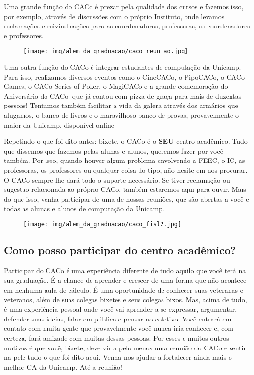 Uma grande função do CACo é prezar pela qualidade dos cursos e fazemos isso,
por exemplo, através de discussões com o próprio Instituto, onde levamos
reclamações e reivindicações para as coordenadoras, professoras, os
coordenadores e professores.

\begin{figure}[H]
  \centering
  \texttt{[image: img/alem\_da\_graduacao/caco\_reuniao.jpg]}
\end{figure}

Uma outra função do CACo é integrar estudantes de computação da Unicamp. Para
isso, realizamos diversos eventos como o CineCACo, o PipoCACo, o CACo Games, o
CACo Series of Poker, o MagiCACo e a grande comemoração do Aniversário do CACo,
que já contou com pizza de graça para mais de duzentas pessoas! Tentamos também
facilitar a vida da galera através dos armários que alugamos, o banco de livros
e o maravilhoso banco de provas, provavelmente o maior da Unicamp, disponível
online.

Repetindo o que foi dito antes: bixete, o CACo é o \textbf{SEU} centro
acadêmico. Tudo que dissemos que fazemos pelas alunas e alunos, queremos fazer
por você também. Por isso, quando houver algum problema envolvendo a FEEC, o
IC, as professoras, os professores ou qualquer coisa do tipo, não hesite em nos
procurar. O CACo sempre lhe dará todo o suporte necessário. Se tiver reclamação
ou sugestão relacionada ao próprio CACo, também estaremos aqui para ouvir. Mais
do que isso, venha participar de uma de nossas reuniões, que são abertas a você
e todas as alunas e alunos de computação da Unicamp.

\begin{figure}[H]
  \centering
  \texttt{[image: img/alem\_da\_graduacao/caco\_fisl2.jpg]}
\end{figure}

\subsection{Como posso participar do centro acadêmico?}

Participar do CACo é uma experiência diferente de tudo aquilo que você terá na
sua graduação. É a chance de aprender e crescer de uma forma que não acontece
em nenhuma aula de cálculo. É uma oportunidade de conhecer suas veteranas e
veteranos, além de suas colegas bixetes e seus colegas bixos. Mas, acima de
tudo, é uma experiência pessoal onde você vai aprender a se expressar,
argumentar, defender suas ideias, falar em público e pensar no coletivo. Você
entrará em contato com muita gente que provavelmente você nunca iria conhecer
e, com certeza, fará amizade com muitas dessas pessoas. Por esses e muitos
outros motivos é que você, bixete, deve vir a pelo menos uma reunião do CACo e
sentir na pele tudo o que foi dito aqui. Venha nos ajudar a fortalecer ainda
mais o melhor CA da Unicamp. Até a reunião!

